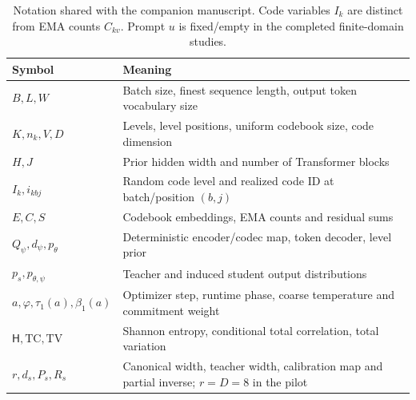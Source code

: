\begin{table}[t]\centering\small
\caption{Notation shared with the companion manuscript. Code variables \(I_k\) are distinct from EMA counts \(C_{kv}\). Prompt \(u\) is fixed/empty in the completed finite-domain studies.}
\label{tab:notation}
\begin{tabularx}{\linewidth}{@{}lY@{}}\toprule
Symbol & Meaning\\\midrule
\(B,L,W\) & Batch size, finest sequence length, output token vocabulary size\\
\(K,n_k,V,D\) & Levels, level positions, uniform codebook size, code dimension\\
\(H,J\) & Prior hidden width and number of Transformer blocks\\
\(I_k,i_{kbj}\) & Random code level and realized code ID at batch/position \((b,j)\)\\
\(E,C,S\) & Codebook embeddings, EMA counts and residual sums\\
\(Q_\psi,d_\psi,p_\theta\) & Deterministic encoder/codec map, token decoder, level prior\\
\(p_s,p_{\theta,\psi}\) & Teacher and induced student output distributions\\
\(a,\varphi,\tau_1(a),\beta_1(a)\) & Optimizer step, runtime phase, coarse temperature and commitment weight\\
\(\mathsf H,\mathrm{TC},\mathrm{TV}\) & Shannon entropy, conditional total correlation, total variation\\
\(r,d_s,P_s,R_s\) & Canonical width, teacher width, calibration map and partial inverse; \(r=D=8\) in the pilot\\
\bottomrule\end{tabularx}\end{table}
